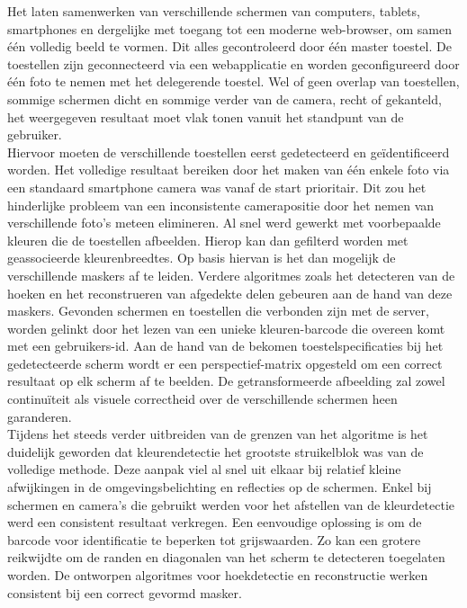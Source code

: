 Het laten samenwerken van verschillende schermen van computers, tablets, smartphones en dergelijke met toegang tot een moderne web-browser, om samen één volledig beeld te vormen. Dit alles gecontroleerd door één master toestel. De toestellen zijn geconnecteerd via een webapplicatie en worden geconfigureerd door één foto te nemen met het delegerende toestel. Wel of geen overlap van toestellen, sommige schermen dicht en sommige verder van de camera, recht of gekanteld, het weergegeven resultaat moet vlak tonen vanuit het standpunt van de gebruiker.\\[3mm]
Hiervoor moeten de verschillende toestellen eerst gedetecteerd en geïdentificeerd worden. Het volledige resultaat bereiken door het maken van één enkele foto via een standaard smartphone camera was vanaf de start prioritair. Dit zou het hinderlijke probleem van een inconsistente camerapositie door het nemen van verschillende foto’s meteen elimineren. Al snel werd gewerkt met voorbepaalde kleuren die de toestellen afbeelden. Hierop kan dan gefilterd worden met geassocieerde kleurenbreedtes. Op basis hiervan is het dan mogelijk de verschillende maskers af te leiden. Verdere algoritmes zoals het detecteren van de hoeken en het reconstrueren van afgedekte delen gebeuren aan de hand van deze maskers. Gevonden schermen en toestellen die verbonden zijn met de server, worden gelinkt door het lezen van een unieke kleuren-barcode die overeen komt met een gebruikers-id. Aan de hand van de bekomen toestelspecificaties bij  het gedetecteerde scherm wordt er een perspectief-matrix opgesteld om een correct resultaat op elk scherm af te beelden. De getransformeerde afbeelding zal zowel continuïteit als visuele correctheid over de verschillende schermen heen garanderen.\\[3mm]
Tijdens het steeds verder uitbreiden van de grenzen van het algoritme is het duidelijk geworden dat kleurendetectie het grootste struikelblok was van de volledige methode. Deze aanpak viel al snel uit elkaar bij relatief kleine afwijkingen in de omgevingsbelichting en reflecties op de schermen. Enkel bij schermen en camera’s die gebruikt werden voor het afstellen van de kleurdetectie werd een consistent resultaat verkregen. Een eenvoudige oplossing is om de barcode voor identificatie te beperken tot grijswaarden. Zo kan een grotere reikwijdte om de randen en diagonalen van het scherm te detecteren toegelaten worden. De ontworpen algoritmes voor hoekdetectie en reconstructie werken consistent bij een correct gevormd masker.
